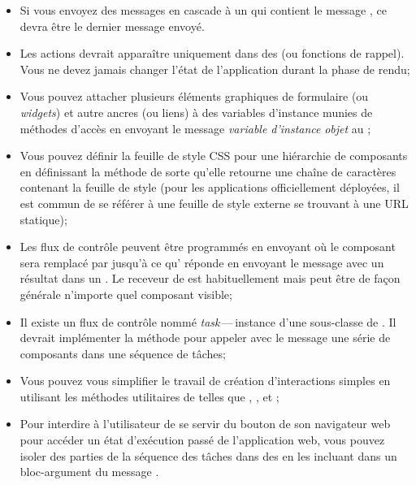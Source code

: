 \documentclass[a4paper,10pt,twoside]{book}
\begin{document}
\begin{itemize}
  \item Si vous envoyez des messages en cascade à un \brush qui
    contient le message , ce  devra être le
    dernier message envoyé.
  \item Les actions devrait apparaître uniquement dans des \callbacks
    (ou fonctions de rappel).
Vous ne devez jamais changer l'état de l'application durant la phase de rendu;
  \item Vous pouvez attacher plusieurs éléments graphiques de
    formulaire (ou \emph{widgets}) et autre ancres (ou liens) à des
    variables d'instance munies de méthodes d'accès en envoyant le
    message  \emph{variable d'instance}  \emph{objet}
    au \brush;
  \item Vous pouvez définir la feuille de style CSS pour une
    hiérarchie de composants en définissant la méthode  de
    sorte qu'elle retourne une chaîne de caractères contenant la
    feuille de style (pour les applications officiellement déployées,
    il est commun de se référer à une feuille de style externe se
    trouvant à une URL statique);
  \item Les flux de contrôle
peuvent être programmés en envoyant  où le composant
 sera remplacé par  jusqu'à ce qu' réponde en
envoyant le message  avec un résultat dans un \callback.
Le receveur de  est habituellement  mais peut être
de façon générale n'importe quel composant visible;
  \item Il existe un flux de contrôle
nommé \emph{task}\,---\,instance d'une sous-classe de . Il
devrait implémenter la méthode  pour appeler avec le message
 une série de composants dans une séquence de tâches;
  \item Vous pouvez vous simplifier le travail de création
    d'interactions simples en utilisant les méthodes utilitaires de
     telles que , ,
     et ;
  \item Pour interdire à l'utilisateur de se servir du bouton \backbtn
    de son navigateur web pour accéder un état d'exécution passé de
    l'application web, vous pouvez isoler des parties de la séquence
    des tâches dans des \transactions en les incluant dans un
    bloc-argument du message .
\end{itemize}

\ifx\wholebook\relax\else 
   
   
\end{document}
